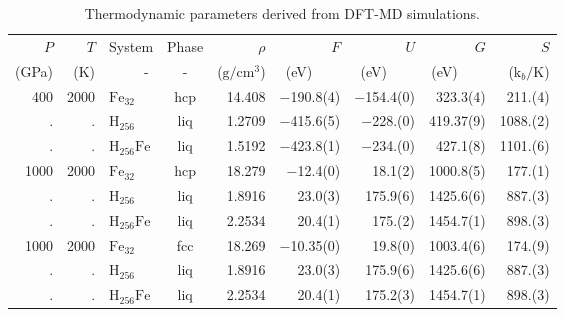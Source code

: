 \begin{table}[h]
\centering

\caption{Thermodynamic parameters derived from DFT-MD simulations.\label{data}}
\begin{adjustbox}{max width=\textwidth}
\begin{tabular}{rrlcrrrrr}
    \hline
 {$P$} & {$T$} & {System} & {Phase} &
{$\rho$} & {$F$} & {$U$} & {$G$} & {$S$}\\
(GPa) & (K) & ~~~~~- &  - & ($\mathrm{g}/\mathrm{cm}^3$) & (eV)~~~~ & (eV)~~~~
& (eV)~~~~ & ($\mathrm{k}_b/\mathrm{K}$) \\
\hline
400   &  2000   &  $\mathrm{Fe}_{32}$     &  hcp  &  14.408  &  $-$190.8(4)\phantom{0}   &  $-$154.4(0)            &  323.3(4)\phantom{0}     &  211.(4)              \\
.     &  .      &  $\mathrm{H}_{256}$    &  liq  &  1.2709  &  $-$415.6(5)\phantom{0}   &  $-$228.(0)\phantom{0}  &  419.37(9)               &  1088.(2)             \\
.     &  .      &  $\mathrm{H}_{256}\mathrm{Fe}$  &  liq  &  1.5192  &  $-$423.8(1)\phantom{0}   &  $-$234.(0)\phantom{0}  &  427.1(8)\phantom{0}     &  1101.(6)             \\
1000  &  2000   &  $\mathrm{Fe}_{32}$     &  hcp  &  18.279  &  $-$12.4(0)\phantom{0}    &  18.1(2)                &  1000.8(5)\phantom{0}    &  177.(1)              \\
.     &  .      &  $\mathrm{H}_{256}$    &  liq  &  1.8916  &  23.0(3)\phantom{0}       &  175.9(6)               &  1425.6(6)\phantom{0}    &  887.(3)              \\
.     &  .      &  $\mathrm{H}_{256}\mathrm{Fe}$  &  liq  &  2.2534  &  20.4(1)\phantom{0}       &  175.(2)\phantom{0}     &  1454.7(1)\phantom{0}    &  898.(3)              \\
1000  &  2000   &  $\mathrm{Fe}_{32}$     &  fcc  &  18.269  &  $-$10.35(0)              &  19.8(0)                &  1003.4(6)\phantom{0}    &  174.(9)              \\
.     &  .      &  $\mathrm{H}_{256}$    &  liq  &  1.8916  &  23.0(3)\phantom{0}       &  175.9(6)               &  1425.6(6)\phantom{0}    &  887.(3)              \\
.     &  .      &  $\mathrm{H}_{256}\mathrm{Fe}$  &  liq  &  2.2534  &  20.4(1)\phantom{0}       &  175.2(3)               &  1454.7(1)\phantom{0}    &  898.(3)              \\

\end{tabular}
\end{adjustbox}
\end{table}
